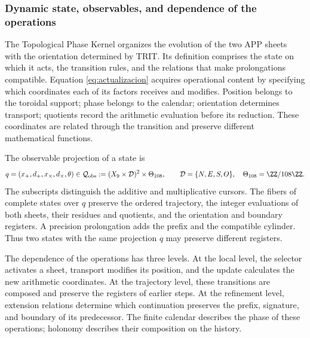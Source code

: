 
\subsubsection{Dynamic state, observables, and dependence of the operations}
\label{tpk-int:estado}

The Topological Phase Kernel organizes the evolution of the two APP sheets
with the orientation determined by TRIT. Its definition comprises the state
on which it acts, the transition rules, and the relations that make
prolongations compatible. Equation \eqref{eq:actualizacion} acquires
operational content by specifying which coordinates each of its
factors receives and modifies. Position belongs to the toroidal support; phase
belongs to the calendar; orientation determines transport;
quotients record the arithmetic evaluation before its reduction.
These coordinates are related through the transition and preserve different
mathematical functions.

The observable projection of a state is
\begin{equation}
 q=(x_+,d_+,x_\times,d_\times,\theta)
 \in\mathcal Q_{\rm obs}
 :=(X_9\times\mathcal D)^2\times\Theta_{108},
 \qquad \mathcal D=\{N,E,S,O\},\quad
 \Theta_{108}=\ZZ/108\ZZ.
 \label{tpk-int:qobs}
\end{equation}
The subscripts distinguish the additive and multiplicative cursors. The
fibers of complete states over \(q\) preserve the ordered trajectory, the integer
evaluations of both sheets, their residues and quotients, and the
orientation and boundary registers. A precision prolongation adds the
prefix and the compatible cylinder. Thus two states with the same
projection \(q\) may preserve different registers.

The dependence of the operations has three levels. At the local level,
the selector activates a sheet, transport modifies its position, and the
update calculates the new arithmetic coordinates. At the trajectory
level, these transitions are composed and preserve the registers of
earlier steps. At the refinement level, extension
relations determine which continuation preserves the prefix, signature, and
boundary of its predecessor. The finite calendar describes the phase of these
operations; holonomy describes their composition on the history.


